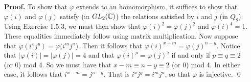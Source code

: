 \begin{enumerate}
      \textbf{Proof.} To show that $\varphi$ extends to an homomorphism, it
      suffices to show that $\varphi(i)$ and $\varphi(j)$ satisfy
      (in $GL_2(\mathbb{C})$) the relations satisfied by $i$ and $j$ (in $Q_8$). Using
      Exercise 1.5.3, we must then show that $\varphi(i)^2 = \varphi(j)^2$ and
      $\varphi(i)^4 = 1$. These equalities immediately follow using matrix
      multiplication. Now suppose that $\varphi(i^xj^y) = \varphi(i^mj^n$). Then
      it follows that $\varphi(i)^{x-m} = \varphi(j)^{n-y}$. Notice that
      $|\varphi(i)| = |\varphi(j)| = 4$ and that $\varphi(i)^p = \varphi(j)^q$
      if and only if $p \equiv q \equiv 2$ (or 0) mod 4. So we must have that
      $x - m \equiv n - y \equiv 2 $ (or 0) mod 4. In either case, it follows
      that $i^{x - m} = j^{n - y}$. That is $i^xj^y = i^mj^n$, so that
      $\varphi$ is injective. \qed
\end{enumerate}
